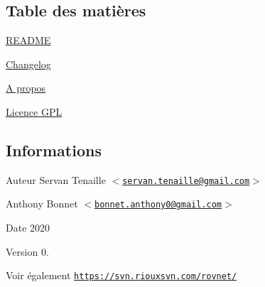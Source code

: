 \hypertarget{index_section_tdm}{}\subsection{Table des matières}\label{index_section_tdm}

\begin{DoxyItemize}
\item \hyperlink{page__r_e_a_d_m_e}{R\+E\+A\+D\+ME}
\item \hyperlink{page_changelog}{Changelog}
\item \hyperlink{page_about}{A propos}
\item \hyperlink{page_licence}{Licence G\+PL}
\end{DoxyItemize}\hypertarget{index_section_infos}{}\subsection{Informations}\label{index_section_infos}
\begin{DoxyAuthor}{Auteur}
Servan Tenaille $<$\href{mailto:servan.tenaille@gmail.com}{\tt servan.\+tenaille@gmail.\+com}$>$ 

Anthony Bonnet $<$\href{mailto:bonnet.anthony0@gmail.com}{\tt bonnet.\+anthony0@gmail.\+com}$>$ 
\end{DoxyAuthor}
\begin{DoxyDate}{Date}
2020 
\end{DoxyDate}
\begin{DoxyVersion}{Version}
0. 
\end{DoxyVersion}
\begin{DoxySeeAlso}{Voir également}
\href{https://svn.riouxsvn.com/rovnet/}{\tt https\+://svn.\+riouxsvn.\+com/rovnet/} 
\end{DoxySeeAlso}
